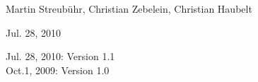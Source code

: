 \begin{frame}
\begin{description}[\breaklabel\setleftmargin{60pt}\setlabelstyle{\color{beamer@SystemCoDesigner@color}}]
\item[Authors:]
Martin Streubühr, Christian Zebelein, Christian Haubelt
\item[Document Release:]
Jul. 28, 2010
\item[Version History:]
Jul. 28, 2010: Version 1.1\\
Oct.1, 2009: Version 1.0
\end{description}
\end{frame}




\begin{frame}
{\footnotesize
\printindex
}
\end{frame}





